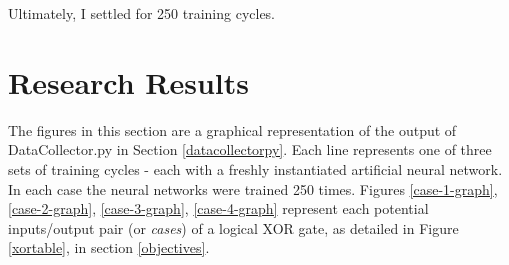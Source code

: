 \documentclass[12pt]{article}
\begin{document}
Ultimately, I settled for 250 training cycles.

\section{Research Results \label{results}}

The figures in this section are a graphical representation of the output of DataCollector.py in Section \ref{datacollectorpy}. Each line represents one of three sets of training cycles - each with a freshly instantiated artificial neural network. In each case the neural networks were trained 250 times. Figures \ref{case-1-graph}, \ref{case-2-graph}, \ref{case-3-graph}, \ref{case-4-graph} represent each potential inputs/output pair  (or \textit{cases}) of a logical XOR gate, as detailed in Figure \ref{xortable}, in section \ref{objectives}.
\end{document}
